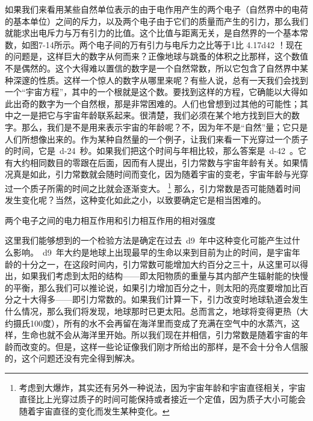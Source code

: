 \documentclass[12pt,oneside]{book}
\providecommand{\numb}[1]{{~\num{#1}~}}
\begin{document}
如果我们来看用某些自然单位表示的由于电作用产生的两个电子（自然界中的电荷的基本单位）之间的斥力，以及两个电子由于它们的质量而产生的引力，那么我们就能求出电斥力与万有引力的比值。这个比值与距离无关，是自然界的一个基本常数，如图7-14所示。两个电子间的万有引力与电斥力之比等于1比 \num{4.17d42} ！现在的问题是，这样巨大的数字从何而来？正像地球与跳蚤的体积之比那样，这个数值不是偶然的。这个大得难以置信的数字是一个自然常数，所以它包含了自然界中某种深邃的性质。这样一个惊人的数字从哪里来呢？有些人说，总有一天我们会找到一个“宇宙方程”，其中的一个根就是这个数。要找到这样的方程，它确能以大得如此出奇的数字为一个自然根，那是非常困难的。人们也曾想到过其他的可能性；其中之一是把它与宇宙年龄联系起来。很清楚，我们必须在某个地方找到巨大的数字。那么，我们是不是用来表示宇宙的年龄呢？不，因为年不是“自然”量；它只是人们所想像出来的。作为某种自然量的一个例子，让我们来看一下光穿过一个质子的时间，它是\numb{d-24}秒。如果我们把这个时间与\uwave{宇宙年龄}\numb{2d10}年相比较，那么答案是\numb{d-42}。它有大约相同数目的零跟在后面，因而有人提出，引力常数与宇宙年龄有关。如果情况真是如此，引力常数就会随时间而变化，因为随着宇宙的变老，宇宙年龄与光穿过一个质子所需的时间之比就会逐渐变大。
\footnote{考虑到大爆炸，其实还有另外一种说法，因为宇宙年龄和宇宙直径相关，宇宙直径比上光穿过质子的时间可能保持或者接近一个定值，因为质子大小可能会随着宇宙直径的变化而发生某种变化。}
那么，引力常数是否可能随着时间发生变化呢？当然，这种变化如此之小，以致要确定它是相当困难的。
\begin{linefig}{两个电子之间的电力相互作用和引力相互作用的相对强度}
\caption{两个电子之间的电力相互作用和引力相互作用的相对强度}
\label{fig:两个电子之间的电力相互作用和引力相互作用的相对强度}
\end{linefig}

这里我们能够想到的一个检验方法是确定在过去\numb{d9}年中这种变化可能产生过什么影响。\numb{d9}年大约是地球上出现最早的生命以来到目前为止的时间，是宇宙年龄的十分之一，在这段时间内，引力常数可能增加大约百分之三十，从这里可以得出，如果我们考虑到太阳的结构——即太阳物质的重量与其内部产生辐射能的快慢的平衡，那么我们可以推论说，如果引力增加百分之十，则太阳的亮度要增加比百分之十大得多——即引力常数的。如果我们计算一下，引力改变时地球轨道会发生什么情况，那么我们将发现，地球那时已更太阳。总而言之，地球将变得更热（大约摄氏100度），所有的水不会再留在海洋里而变成了充满在空气中的水蒸汽，这样，生命也就不会从海洋里开始。所以我们现在并相信，引力常数是随着宇宙的年龄而改变的。但是，这样一些论证像我们刚才所给出的那样，是不会十分令人信服的，这个问题还没有完全得到解决。
\end{document}
